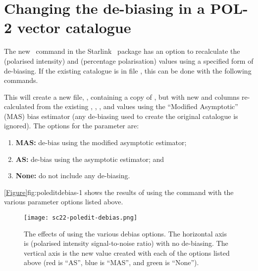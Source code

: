 \section{Changing the de-biasing in a POL-2 vector catalogue}

The new \poledit\ command in the Starlink \POLPACK\ package has an option
to recalculate the  (polarised intensity) and  (percentage polarisation)
values using a specified form of de-biasing. If the existing catalogue is in
file , this can be done with the following commands.

\begin{terminalv}
\end{terminalv}

This will create a new file, , containing a copy of
, but with new  and  columns re-calculated from the
existing , , , and  values using the ``Modified Asymptotic'' (MAS) bias
estimator (any de-biasing used to create the original catalogue is ignored).
The options for the  parameter are:

\begin{enumerate}
\item {\bf MAS:} de-bias using the modified asymptotic estimator;
\item {\bf AS:} de-bias using the asymptotic estimator; and
\item {\bf None:} do not include any de-biasing.
\end{enumerate}

\cref{Figure}{fig:poleditdebias-1}{} shows the results of using the
 command with the various  parameter options
listed above.

\begin{figure}[ht!]
\begin{center}
\texttt{[image: sc22-poledit-debias.png]}
\caption [The effects of using the various  debias options]{
  The effects of using the various  debias options. The horizontal axis
  is  (polarised intensity signal-to-noise ratio) with no de-biasing. The vertical
  axis is the new  value created with each of the  options listed
  above (red is ``AS'', blue is ``MAS'', and green is ``None'').
\label{fig:poleditdebias-1}
}
\end{center}
\end{figure}


